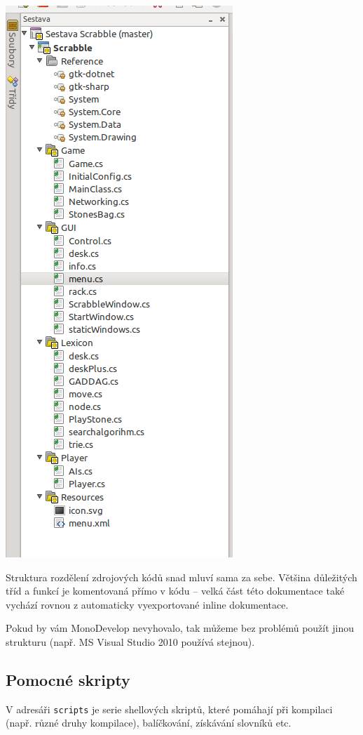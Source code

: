 \documentclass[a4paper]{article}
\begin{document}
\includegraphics[scale=0.5]{pic/monodevelop-project.png}

Struktura rozdělení zdrojových kódů snad mluví sama za sebe. Většina důležitých tříd a funkcí je komentovaná přímo v kódu -- velká část této dokumentace také vychází rovnou z automaticky vyexportované inline dokumentace. 

Pokud by vám MonoDevelop nevyhovalo, tak můžeme bez problémů použít jinou strukturu (např. MS Visual Studio 2010 používá stejnou).

\subsection{Pomocné skripty}\label{scripts}
V adresáři \texttt{scripts} je serie shellových skriptů, které pomáhají při kompilaci (např. různé druhy kompilace), balíčkování, získávání slovníků etc. 
\end{document}

